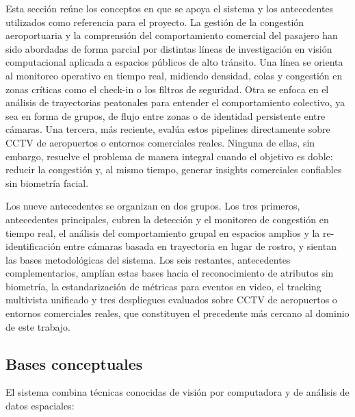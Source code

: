 \documentclass[12pt,a4paper]{article}
\begin{document}
Esta sección reúne los conceptos en que se apoya el sistema y los antecedentes
utilizados como referencia para el proyecto. La gestión de la congestión aeroportuaria y la
comprensión del comportamiento comercial del pasajero han sido abordadas
de forma parcial por distintas líneas de investigación en visión
computacional aplicada a espacios públicos de alto tránsito. Una línea se
orienta al monitoreo operativo en tiempo real, midiendo densidad, colas y
congestión en zonas críticas como el check-in o los filtros de
seguridad. Otra se enfoca en el análisis de trayectorias peatonales para
entender el comportamiento colectivo, ya sea en forma de grupos, de flujo
entre zonas o de identidad persistente entre cámaras. Una tercera, más
reciente, evalúa estos pipelines directamente sobre CCTV de aeropuertos
o entornos comerciales reales. Ninguna de ellas, sin embargo, resuelve el
problema de manera integral cuando el objetivo es doble: reducir la
congestión y, al mismo tiempo, generar insights comerciales confiables
sin biometría facial.

Los nueve antecedentes se organizan en dos grupos. Los tres primeros,
antecedentes principales, cubren la detección y el monitoreo de
congestión en tiempo real, el análisis del comportamiento grupal en
espacios amplios y la re-identificación entre cámaras basada en
trayectoria en lugar de rostro, y sientan las bases metodológicas del
sistema. Los seis restantes, antecedentes complementarios, amplían estas
bases hacia el reconocimiento de atributos sin biometría, la
estandarización de métricas para eventos en video, el tracking multivista
unificado y tres despliegues evaluados sobre CCTV de aeropuertos o
entornos comerciales reales, que constituyen el precedente más cercano al
dominio de este trabajo.

\subsection{Bases conceptuales}
\label{sec:bases}

El sistema combina técnicas conocidas de visión por computadora y de análisis
de datos espaciales:
\end{document}
